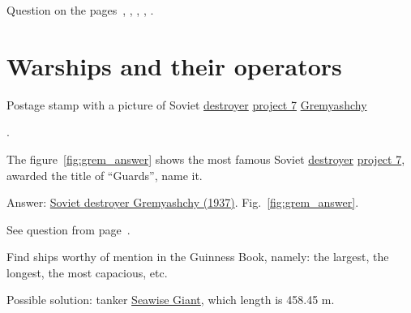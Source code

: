 \small{Question on the pages~\pageref{fig:flag_question_human_settlements1}, \pageref{fig:flag_question_human_settlements2}, \pageref{fig:flag_question_human_settlements3}, \pageref{fig:flag_question_human_settlements4}, \pageref{fig:flag_question_human_settlements5}.}



\section{Warships and their operators}

\begin{marginfigure}[0.0cm]
	{
	  \setlength{\fboxsep}{0pt}%
	  \setlength{\fboxrule}{1pt}%
	}
	\caption{Postage stamp with a picture of Soviet \href{https://en.wikipedia.org/wiki/Destroyer}{destroyer} \href{https://en.wikipedia.org/wiki/Gnevny-class_destroyer}{project 7} \href{https://en.wikipedia.org/wiki/Soviet_destroyer_Gremyashchy_(1937)}{Gremyashchy}}.%
	\label{fig:grem_answer}%
\end{marginfigure}

\begin{exercise}
	\label{answer:ship_1}
	The figure~\ref{fig:grem_answer} shows the most famous Soviet \href{https://en.wikipedia.org/wiki/Destroyer}{destroyer} \href{https://en.wikipedia.org/wiki/Gnevny-class_destroyer}{project 7}, awarded the title of ``Guards'', name it.
\end{exercise}

Answer: \href{https://en.wikipedia.org/wiki/Soviet_destroyer_Gremyashchy_(1937)}{Soviet destroyer Gremyashchy (1937)}. Fig.~\ref{fig:grem_answer}.

\small{See question from page~\pageref{question:ship_1}.}


\begin{exercise}
	\label{answer:ship_2}
	Find ships worthy of mention in the Guinness Book, namely: the largest, the longest, the most capacious, etc.
\end{exercise}

Possible solution: tanker \href{https://en.wikipedia.org/wiki/Seawise_Giant}{Seawise Giant}, which length is 458.45 m.

